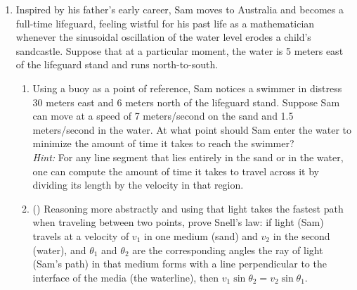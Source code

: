 \documentclass{article}
\begin{document}
\begin{enumerate}
    \addtocounter{enumi}{6}

    \item Inspired by his father's early career, Sam moves to Australia and becomes a full-time lifeguard, feeling wistful for his past life as a mathematician whenever the sinusoidal oscillation of the water level erodes a child's sandcastle. Suppose that at a particular moment, the water is 5 meters east of the lifeguard stand and runs north-to-south.  

    \begin{enumerate}
        \item Using a buoy as a point of reference, Sam notices a swimmer in distress 30 meters east and 6 meters north of the lifeguard stand. Suppose Sam can move at a speed of 7 meters/second on the sand and 1.5 meters/second in the water. At what point should Sam enter the water to minimize the amount of time it takes to reach the swimmer? \\
       \textit{Hint:} For any line segment that lies entirely in the sand or in the water, one can compute the amount of time it takes to travel across it by dividing its length by the velocity in that region.  

        \vfill 

        \item (\textasteriskcentered{}) Reasoning more abstractly and using that light takes the fastest path when traveling between two points, prove Snell's law: if light (Sam) travels at a velocity of $v_1$ in one medium (sand) and $v_2$ in the second (water), and $\theta_1$ and $\theta_2$ are the corresponding angles the ray of light (Sam's path) in that medium forms with a line perpendicular to the interface of the media (the waterline), then $v_1\sin\theta_2 = v_2\sin\theta_1$.    

        \vfill 
    \end{enumerate}
    
\end{enumerate}

    
\end{document}
